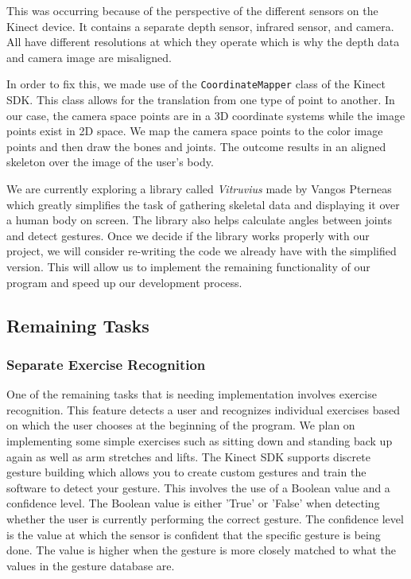 \documentclass[onecolumn, draftclsnofoot,10pt, compsoc]{IEEEtran}
\begin{document}
This was occurring because of the perspective of the different sensors on the Kinect device. It contains a separate depth sensor, infrared sensor, and camera. All have different resolutions at which they operate which is why the depth data and camera image are misaligned. 

In order to fix this, we made use of the \texttt{CoordinateMapper} class of the Kinect SDK. This class allows for the translation from one type of point to another. In our case, the camera space points are in a 3D coordinate systems while the image points exist in 2D space. We map the camera space points to the color image points and then draw the bones and joints. The outcome results in an aligned skeleton over the image of the user's body. 

We are currently exploring a library called \textit{Vitruvius} made by Vangos Pterneas which greatly simplifies the task of gathering skeletal data and displaying it over a human body on screen. The library also helps calculate angles between joints and detect gestures. Once we decide if the library works properly with our project, we will consider re-writing the code we already have with the simplified version. This will allow us to implement the remaining functionality of our program and speed up our development process.

\subsection{Remaining Tasks}
\subsubsection{Separate Exercise Recognition}
One of the remaining tasks that is needing implementation involves exercise recognition. This feature detects a user and recognizes individual exercises based on which the user chooses at the beginning of the program. We plan on implementing some simple exercises such as sitting down and standing back up again as well as arm stretches and lifts. The Kinect SDK supports discrete gesture building which allows you to create custom gestures and train the software to detect your gesture. This involves the use of a Boolean value and a confidence level. The Boolean value is either 'True' or 'False' when detecting whether the user is currently performing the correct gesture. The confidence level is the value at which the sensor is confident that the specific gesture is being done. The value is higher when the gesture is more closely matched to what the values in the gesture database are.
\end{document}
